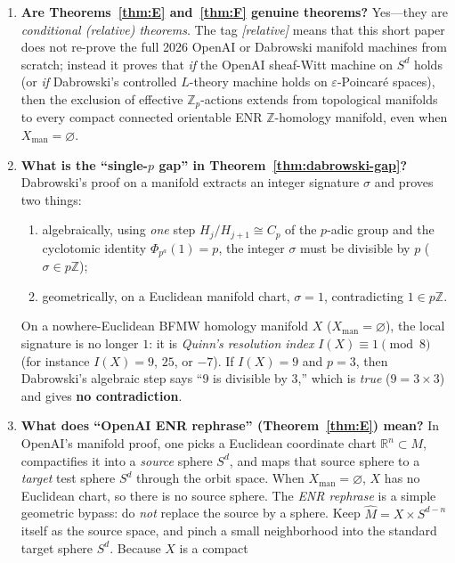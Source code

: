 \documentclass[11pt]{article}
\theoremstyle{definition}
\newcommand{\status}[1]{\textit{\textcolor{black!70}{[#1]}}}
\begin{document}
\begin{enumerate}[label=\textbf{\arabic*.}]
\item \textbf{Are Theorems~\ref{thm:E} and~\ref{thm:F} genuine theorems?}
Yes---they are \emph{conditional (relative) theorems}.  The tag
\status{relative} means that this short paper does not re-prove the full
2026 OpenAI or Dabrowski manifold machines from scratch; instead it proves that
\emph{if} the OpenAI sheaf-Witt machine on $S^d$ holds (or \emph{if}
Dabrowski's controlled $L$-theory machine holds on $\varepsilon$-Poincar\'e
spaces), then the exclusion of effective $\mathbb{Z}_p$-actions extends from
topological manifolds to every compact connected orientable ENR
$\mathbb{Z}$-homology manifold, even when $X_{\mathrm{man}}=\varnothing$.
\item \textbf{What is the ``single-$p$ gap'' in
Theorem~\ref{thm:dabrowski-gap}?}
Dabrowski's proof on a manifold extracts an integer signature $\sigma$ and
proves two things:
\begin{enumerate}[label=(\alph*)]
\item algebraically, using \emph{one} step $H_j/H_{j+1}\cong C_p$ of the
$p$-adic group and the cyclotomic identity $\Phi_{p^a}(1)=p$, the integer
$\sigma$ must be divisible by $p$ ($\sigma\in p\mathbb{Z}$);
\item geometrically, on a Euclidean manifold chart, $\sigma=1$, contradicting
$1\in p\mathbb{Z}$.
\end{enumerate}
On a nowhere-Euclidean BFMW homology manifold $X$ ($X_{\mathrm{man}}=\varnothing$),
the local signature is no longer $1$: it is \emph{Quinn's resolution index}
$I(X)\equiv 1\pmod{8}$ (for instance $I(X)=9$, $25$, or $-7$).  If $I(X)=9$
and $p=3$, then Dabrowski's algebraic step says ``$9$ is divisible by $3$,''
which is \emph{true} ($9=3\times 3$) and gives \textbf{no contradiction}.
\item \textbf{What does ``OpenAI ENR rephrase'' (Theorem~\ref{thm:E}) mean?}
In OpenAI's manifold proof, one picks a Euclidean coordinate chart
$\mathbb{R}^n\subset M$, compactifies it into a \emph{source} sphere $S^d$,
and maps that source sphere to a \emph{target} test sphere $S^d$ through the
orbit space.  When $X_{\mathrm{man}}=\varnothing$, $X$ has no Euclidean chart,
so there is no source sphere.  The \emph{ENR rephrase} is a simple geometric
bypass: do \emph{not} replace the source by a sphere.  Keep
$\widehat{M}=X\times S^{d-n}$ itself as the source space, and pinch a small
neighborhood into the standard target sphere $S^d$.  Because $X$ is a compact

\end{enumerate}
\end{document}
